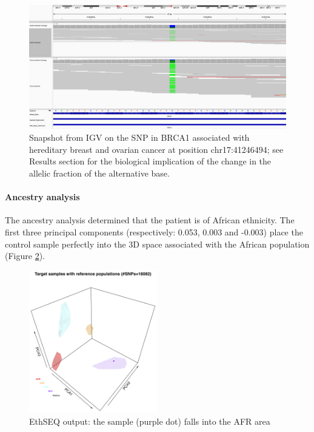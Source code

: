 \documentclass[11pt]{article}
\begin{document}
\begin{figure}[H]
   \centering
   \includegraphics[width=\textwidth]{images/BRCA1_snp_het_del.png}
   \caption{\footnotesize{Snapshot from IGV on the SNP in BRCA1 associated with hereditary breast and ovarian cancer at position chr17:41246494; see Results section for the biological implication of the change in the allelic fraction of the alternative base.}}
   \label{igv_BRCA1}
\end{figure}


\paragraph{Ancestry analysis}
The ancestry analysis determined that the patient is of African ethnicity. The first three principal components (respectively: 0.053, 0.003 and -0.003) place the control sample perfectly into the 3D space associated with the African population (Figure \ref{ethSEQ}).

\begin{figure}[H]
   \centering
   \includegraphics[width=0.5\textwidth]{images/EthSEQ_out.png}
   \caption{\footnotesize{EthSEQ output: the sample (purple dot) falls into the AFR area}}
   \label{ethSEQ}
\end{figure}
\end{document}
